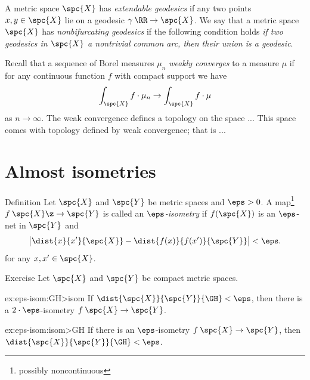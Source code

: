 A metric space $\spc{X}$ has \emph{extendable geodesics} if any two points $x,y\in\spc{X}$
lie on a geodesic $\gamma\:\RR\to \spc{X}$.
We say that a metric space $\spc{X}$ has \emph{nonbifurcating geodesics} if the following condition holds
\textit{if two geodesics in $\spc{X}$ a nontrivial common arc, then their union is a geodesic}.

















Recall that a sequence of Borel measures $\mu_n$ \emph{weakly converges} to a measure $\mu$ if for any continuous function $f$ with compact support we have
\[\int_{\spc{X}} f\cdot \mu_n\to\int_{\spc{X}} f\cdot \mu\]
as $n\to \infty$.
The weak convergence defines a topology on the space ...
This space comes with topology defined by weak convergence;
that is ...

















\section{Almost isometries}\label{sec:alm-isom}

\begin{thm}{Definition} Let $\spc{X}$ and $\spc{Y}$ be metric spaces and $\eps>0$. 
A  map\footnote{possibly noncontinuous} $f\: \spc{X} \z\to \spc{Y}$ is called an \emph{$\eps$-isometry} 
if $f(\spc{X})$ is an $\eps$-net in $\spc{Y}$ and
\[\bigl|\dist{x}{x'}{\spc{X}}-\dist{f(x)}{f(x')}{\spc{Y}}\bigr|<\eps.\]
for any $x,x'\in \spc{X}$.
\end{thm}

\begin{thm}{Exercise}\label{ex:eps-isom}
Let $\spc{X}$ and $\spc{Y}$ be compact metric spaces.

\begin{subthm}{ex:eps-isom:GH>isom}
If $\dist{\spc{X}}{\spc{Y}}{\GH}<\eps$, then there is a $2\cdot\eps$-isometry $f\:\spc{X}\to\spc{Y}$.
\end{subthm}

\begin{subthm}{ex:eps-isom:isom>GH}
If there is an $\eps$-isometry $f\:\spc{X}\to\spc{Y}$, then $\dist{\spc{X}}{\spc{Y}}{\GH}<\eps$.
\end{subthm}

\end{thm}


